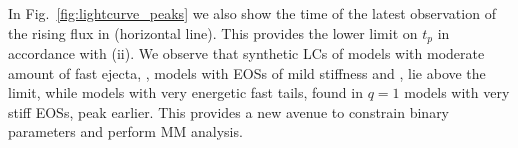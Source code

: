 In Fig.~\ref{fig:lightcurve_peaks} we also show the time of the latest observation 
of the rising flux in \GRB{} (horizontal line). This provides the lower limit on $t_p$
in accordance with (ii).
%
We observe that synthetic \acp{LC} of models with 
moderate amount of fast ejecta, \eg, models with 
\acp{EOS} of mild stiffness and \mr{}, lie above the limit, while models with very 
energetic fast tails, found in $q=1$ models with very stiff \acp{EOS}, peak earlier. 
This provides a new avenue to constrain binary parameters and perform \ac{MM} analysis.

